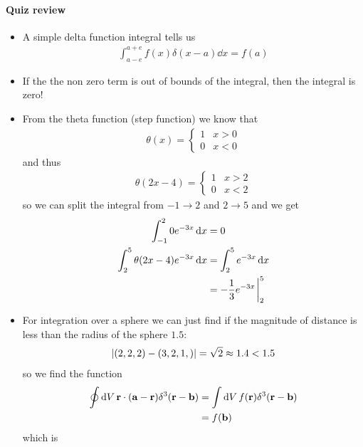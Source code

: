 \documentclass[../main.tex]{subfiles}
\begin{document}
\paragraph*{Quiz review}
\begin{itemize}
    \item A simple delta function integral tells us
    \begin{align*}
        \int_{a - e}^{a + e} f(x) \delta(x - a) \dd{x} = f(a)
    \end{align*}
    \item If the the non zero term is out of bounds of the integral, then the integral is zero!
    \item From the theta function (step function) we know that
    \begin{align*}
        \theta(x) = \begin{cases}
            1 & x > 0 \\
            0 & x < 0
        \end{cases}
    \end{align*}
    and thus
    \begin{align*}
        \theta(2x - 4) = \begin{cases}
            1 & x > 2 \\
            0 & x < 2
        \end{cases}
    \end{align*}
    so we can split the integral from $-1 \to 2$ and $2 \to 5$ and we get
    \begin{align*}
        \int_{-1}^2 0 e^{-3x} \dd{x} &= 0 \\
        \int_2^5 \theta(2x - 4) e^{-3x} \dd{x} &= \int_2^5 e^{-3x} \dd{x} \\
        &= -\frac{1}{3} e^{-3x} \eval_2^5
    \end{align*}
    \item For integration over a sphere we can just find if the magnitude of distance is less than
    the radius of the sphere $1.5$:
    \begin{align*}
        \abs{(2,2,2) - (3,2,1,)} = \sqrt{2} \approx 1.4 < 1.5
    \end{align*}
    so we find the function
    \begin{align*}
        \oint \dd{V} \vb r \cdot (\vb a - \vb r) \delta^3(\vb r - \vb b) 
        &= \int \dd{V} f(\vb r) \delta^3(\vb r - \vb b) \\
        &= f(\vb b)
    \end{align*}
    which is
    \begin{align*}

\end{align*}
\end{itemize}
\end{document}
